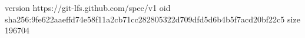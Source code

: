 version https://git-lfs.github.com/spec/v1
oid sha256:9fe622aaeffd74e58f11a2cb71cc282805322d709dfd5d6b4b5f7acd20bf22c5
size 196704

